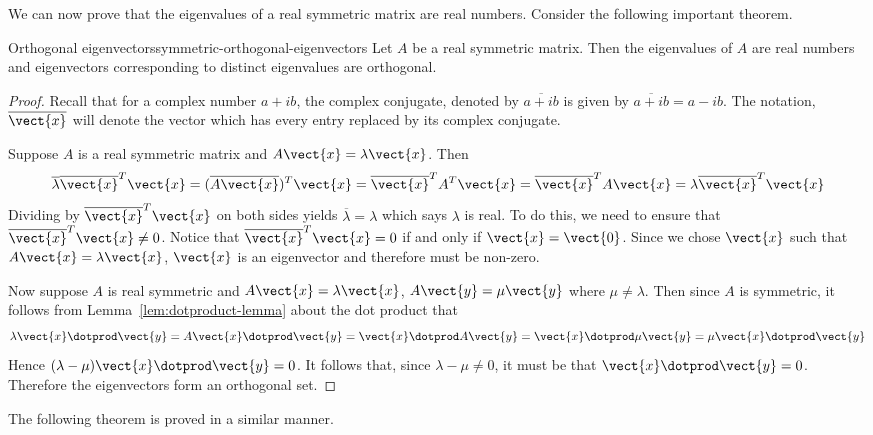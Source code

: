 We can now prove that the eigenvalues of a real symmetric matrix are real numbers.  Consider the following important theorem. 

\begin{theorem}{Orthogonal eigenvectors}{symmetric-orthogonal-eigenvectors}
Let $A$ be a real symmetric matrix. Then the eigenvalues of $A$ are real numbers and eigenvectors corresponding to distinct eigenvalues are orthogonal. 
\end{theorem}

\begin{proof}
Recall that for a complex number $a+ib$, the complex conjugate, denoted by $
\overline{a+ib}$ is given by $\overline{a+ib}=a-ib$. The
notation, $\overline{\vect{x}}$ will denote the vector which has every
entry replaced by its complex conjugate.

Suppose $A$ is a real symmetric matrix and $A\vect{x}=\lambda \vect{x}$.
Then 
\begin{equation*}
\overline{\lambda }\overline{\vect{x}}^{T}\vect{x}=(\overline{A
\vect{x}}) ^{T}\vect{x}=\overline{\vect{x}}^{T}A^{T}\vect{x}=
\overline{\vect{x}}^{T}A\vect{x}=\lambda \overline{\vect{x}}^{T}
\vect{x}
\end{equation*}
Dividing by $\overline{\vect{x}}^{T}\vect{x}$ on both sides yields $
\overline{\lambda }=\lambda $ which says $\lambda $ is real. To do this, we need to ensure that $\overline{\vect{x}}^{T}\vect{x} \neq 0$. Notice that $\overline{\vect{x}}^{T}\vect{x} = 0$ if and only if $\vect{x} = \vect{0}$. Since we chose $\vect{x}$ such that $A\vect{x} = \lambda \vect{x}$, $\vect{x}$ is an eigenvector and therefore must be non-zero.  

Now suppose $A$ is real symmetric and $A\vect{x}=\lambda \vect{x}$, $A
\vect{y}=\mu \vect{y}$ where $\mu \neq \lambda$. Then since $A$
is symmetric, it follows from Lemma~\ref{lem:dotproduct-lemma} about the dot product that 
\begin{equation*}
\lambda \vect{x}\dotprod \vect{y}=A\vect{x}\dotprod \vect{y}=\vect{x}\dotprod A\vect{y}=\vect{x}\dotprod \mu \vect{y}=\mu \vect{x}\dotprod \vect{y}
\end{equation*}
Hence $(\lambda -\mu) \vect{x}\dotprod \vect{y}=0$. It follows that,
since $\lambda -\mu \neq 0$, it must be that $\vect{x}\dotprod \vect{y}=0$. Therefore the eigenvectors form an orthogonal set. 
\end{proof}

The following theorem is proved in a similar manner.

